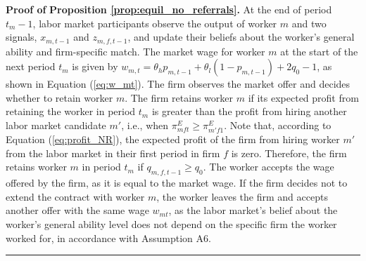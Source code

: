 \documentclass[12pt]{article}
\newenvironment{proof}[1][Proof of]{\noindent\textbf{#1} }{\ \rule{0.5em}{0.5em}}
\begin{document}
\begin{proof}
    \textbf{Proposition \ref{prop:equil_no_referrals}.} 
    At the end of period $t_m-1$, labor market participants observe the output of worker $m$ and two signals, $x_{m,t-1}$ and $z_{m,f,t-1}$, and update their beliefs about the worker's general ability and firm-specific match. The market wage for worker $m$ at the start of the next period $t_m$ is given by $w_{m,t} = \theta_h p_{m,t-1} + \theta_l (1-p_{m,t-1}) + 2q_0 - 1$, as shown in Equation (\ref{eq:w_mt}). The firm observes the market offer and decides whether to retain worker $m$. The firm retains worker $m$ if its expected profit from retaining the worker in period $t_m$ is greater than the profit from hiring another labor market candidate $m'$, i.e., when $\pi^E_{mft} \geq \pi^E_{m'f1}$. Note that, according to Equation (\ref{eq:profit_NR}), the expected profit of the firm from hiring worker $m'$ from the labor market in their first period in firm $f$ is zero. Therefore, the firm retains worker $m$ in period $t_m$ if $q_{m,f,t-1} \geq q_0$. The worker accepts the wage offered by the firm, as it is equal to the market wage. If the firm decides not to extend the contract with worker $m$, the worker leaves the firm and accepts another offer with the same wage $w_{mt}$, as the labor market's belief about the worker's general ability level does not depend on the specific firm the worker worked for, in accordance with Assumption A6.
\end{proof}
\end{document}
